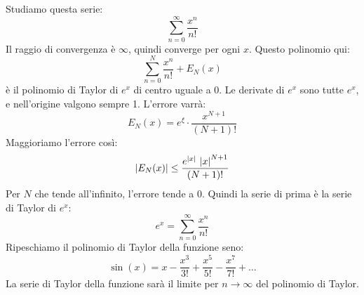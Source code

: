 Studiamo questa serie:
\[
\sum_{n = 0}^{\infty} \frac{x^n}{n!}
\]
Il raggio di convergenza \`e $\infty$, quindi converge per ogni $x$. Questo polinomio qui:
\[
\sum_{n = 0}^{N} \frac{x^n}{n!} + E_N (x)
\]
\`e il polinomio di Taylor di $e^x$ di centro uguale a 0. Le derivate di $e^x$ sono tutte $e^x$, e nell'origine valgono sempre 1. L'errore varr\`a:
\[
E_N (x) = e^\xi \cdot \frac{x^{N+1}}{(N+1)!}
\]
Maggioriamo l'errore cos\`i:
\[
\left\lvert{E_N (x)}\right\rvert \le \frac{e^{\left\lvert{x}\right\rvert} \, \left\lvert{x}\right\rvert^{N+1}}{(N + 1)!}
\]
Per $N$ che tende all'infinito, l'errore tende a 0. Quindi la serie di prima \`e la serie di Taylor di $e^x$:
\[
e^x = \sum_{n = 0}^{\infty} \frac{x^n}{n!}
\]
Ripeschiamo il polinomio di Taylor della funzione seno:
\[
\sin (x) = x - \frac{x^3}{3!} + \frac{x^5}{5!} - \frac{x^7}{7!} + \ldots
\]
La serie di Taylor della funzione sar\`a il limite per $n \to \infty$ del polinomio di Taylor.



